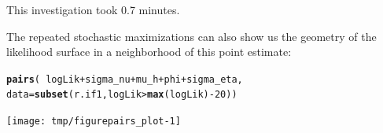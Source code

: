 \documentclass{beamer}\usepackage[]{graphicx}\usepackage[]{color}
\makeatletter
\newcommand{\hlnum}[1]{\textcolor[rgb]{0.686,0.059,0.569}{#1}}%
\newcommand{\hlopt}[1]{\textcolor[rgb]{0,0,0}{#1}}%
\newcommand{\hlstd}[1]{\textcolor[rgb]{0.345,0.345,0.345}{#1}}%
\newcommand{\hlkwc}[1]{\textcolor[rgb]{0.333,0.667,0.333}{#1}}%
\newcommand{\hlkwd}[1]{\textcolor[rgb]{0.737,0.353,0.396}{\textbf{#1}}}%
\newenvironment{kframe}{%
 \def\at@end@of@kframe{}%
 \ifinner\ifhmode%
  \def\at@end@of@kframe{\end{minipage}}%
  \begin{minipage}{\columnwidth}%
 \fi\fi%
 \def\FrameCommand##1{\hskip\@totalleftmargin \hskip-\fboxsep
 \colorbox{shadecolor}{##1}\hskip-\fboxsep
     \hskip-\linewidth \hskip-\@totalleftmargin \hskip\columnwidth}%
 \MakeFramed {\advance\hsize-\width
   \@totalleftmargin\z@ \linewidth\hsize
   \@setminipage}}%
 {\par\unskip\endMakeFramed%
 \at@end@of@kframe}
\newenvironment{knitrout}{}{} %
\makeatother
\begin{document}
\begin{frame}[fragile]

\bi

\item This investigation took  0.7 minutes. 

\item The repeated stochastic maximizations can also show us the geometry of the likelihood surface in a neighborhood of this point estimate:

\ei

\begin{knitrout}\small
{}\color{fgcolor}\begin{kframe}
\begin{alltt}
\hlkwd{pairs}\hlstd{(}\hlopt{~}\hlstd{logLik}\hlopt{+}\hlstd{sigma_nu}\hlopt{+}\hlstd{mu_h}\hlopt{+}\hlstd{phi}\hlopt{+}\hlstd{sigma_eta,}
  \hlkwc{data}\hlstd{=}\hlkwd{subset}\hlstd{(r.if1,logLik}\hlopt{>}\hlkwd{max}\hlstd{(logLik)}\hlopt{-}\hlnum{20}\hlstd{))}
\end{alltt}
\end{kframe}
\end{knitrout}

\vspace{-5mm}

\begin{knitrout}\small
{}\color{fgcolor}

{\centering \texttt{[image: tmp/figurepairs\_plot-1]} 

}



\end{knitrout}

\end{frame}
\end{document}
